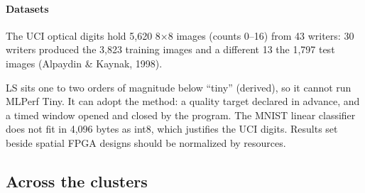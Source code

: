 \paragraph{Datasets} The UCI optical digits hold 5,620 8×8 images (counts 0–16) from 43 writers: 30 writers produced the 3,823 training images and a different 13 the 1,797 test images (Alpaydin \& Kaynak, 1998).

\begin{forls}[For LS]
LS sits one to two orders of magnitude below “tiny” (derived), so it cannot run MLPerf Tiny. It can adopt the method: a quality target declared in advance, and a timed window opened and closed by the program. The MNIST linear classifier does not fit in 4,096 bytes as int8, which justifies the UCI digits. Results set beside spatial FPGA designs should be normalized by resources.

\end{forls}
\subsection{Across the clusters}

